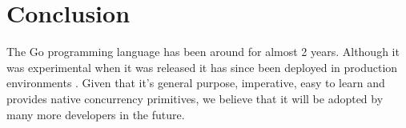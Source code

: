 \documentclass[8pt, twocolumn]{article}
\begin{document}
\section{Conclusion}
The Go programming language has been around for almost 2 years. Although
it was experimental when it was released it has since been deployed in
production environments \cite{heroku}. Given that it's general
purpose, imperative, easy to learn and provides native concurrency
primitives, we believe that it will be adopted by many more developers in the
future.
 

\end{document}
